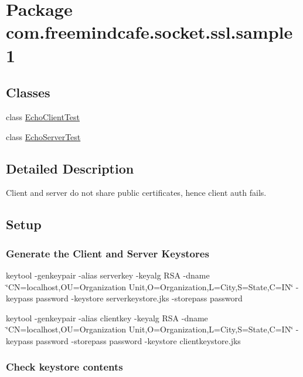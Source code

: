 \hypertarget{namespacecom_1_1freemindcafe_1_1socket_1_1ssl_1_1sample1}{}\section{Package com.\+freemindcafe.\+socket.\+ssl.\+sample1}
\label{namespacecom_1_1freemindcafe_1_1socket_1_1ssl_1_1sample1}
\subsection*{Classes}
\begin{DoxyCompactItemize}
\item 
class \hyperlink{classcom_1_1freemindcafe_1_1socket_1_1ssl_1_1sample1_1_1_echo_client_test}{Echo\+Client\+Test}
\item 
class \hyperlink{classcom_1_1freemindcafe_1_1socket_1_1ssl_1_1sample1_1_1_echo_server_test}{Echo\+Server\+Test}
\end{DoxyCompactItemize}


\subsection{Detailed Description}
Client and server do not share public certificates, hence client auth fails.

\subsection*{Setup}

\subsubsection*{Generate the Client and Server Keystores}


\begin{DoxyItemize}
\item keytool -\/genkeypair -\/alias serverkey -\/keyalg R\+S\+A -\/dname \char`\"{}\+C\+N=localhost,\+O\+U=\+Organization Unit,\+O=\+Organization,\+L=\+City,\+S=\+State,\+C=\+I\+N\char`\"{} -\/keypass password -\/keystore serverkeystore.\+jks -\/storepass password 
\item keytool -\/genkeypair -\/alias clientkey -\/keyalg R\+S\+A -\/dname \char`\"{}\+C\+N=localhost,\+O\+U=\+Organization Unit,\+O=\+Organization,\+L=\+City,\+S=\+State,\+C=\+I\+N\char`\"{} -\/keypass password -\/storepass password -\/keystore clientkeystore.\+jks 
\end{DoxyItemize}\subsubsection*{Check keystore contents}


